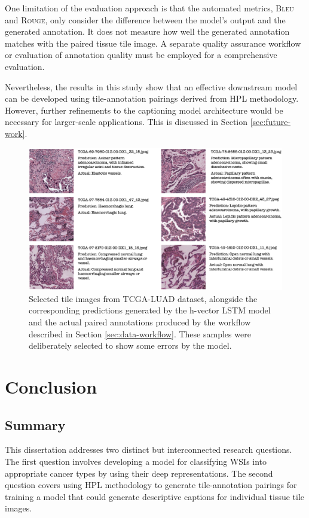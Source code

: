 \documentclass{l4proj}
\begin{document}
One limitation of the evaluation approach is that the automated metrics, \textsc{Bleu} and \textsc{Rouge}, only consider the difference between the model's output and the generated annotation. It does not measure how well the generated annotation matches with the paired tissue tile image. A separate quality assurance workflow or evaluation of annotation quality must be employed for a comprehensive evaluation.

Nevertheless, the results in this study show that an effective downstream model can be developed using tile-annotation pairings derived from HPL methodology. However, further refinements to the captioning model architecture would be necessary for larger-scale applications. This is discussed in Section \ref{sec:future-work}.

\begin{figure}[h!]
    \centering
    \includegraphics[width=1\linewidth]{images/caption.png}
    \caption{Selected tile images from TCGA-LUAD dataset, alongside the corresponding predictions generated by the h-vector LSTM model and the actual paired annotations produced by the workflow described in Section \ref{sec:data-workflow}. These samples were deliberately selected to show some errors by the model.}
    \label{fig:caption}
\end{figure}

\chapter{Conclusion}    

\section{Summary}
This dissertation addresses two distinct but interconnected research questions. The first question involves developing a model for classifying WSIs into appropriate cancer types by using their deep representations. The second question covers using HPL methodology to generate tile-annotation pairings for training a model that could generate descriptive captions for individual tissue tile images.
\end{document}
